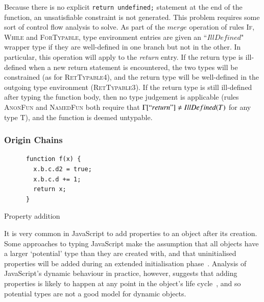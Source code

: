 \documentclass[12pt,a4paper,twoside,openright]{report}
\theoremstyle{definition}
\theoremstyle{dotless}
\newcommand*{\js}{\texttt}
\begin{document}
Because there is no explicit \js{return undefined;} statement at the end of the
function, an unsatisfiable constraint is not generated. This problem requires
some sort of control flow analysis to solve. As part of the $merge$ operation
of rules \textsc{If}, \textsc{While} and \textsc{ForTypable}, type environment
entries are given an ``$IllDefined$" wrapper type if they are well-defined in
one branch but not in the other. In particular, this operation will apply to
the \textit{return} entry. If the return type is ill-defined when a new return
statement is encountered, the two types will be constrained (as for
\textsc{RetTypable4}), and the return type will be well-defined in the outgoing
type environment (\textsc{RetTypable3}).  If the return type is still
ill-defined after typing the function body, then no type judgement is
applicable (rules \textsc{AnonFun} and \textsc{NamedFun} both require that
$\Gamma[``return"]\neq IllDefined(T)$ for any type T), and the function is
deemed untypable.

\subsubsection*{Origin Chains}
\begin{program}[t]
  \centering
  \begin{minipage}[b]{0.45\linewidth}
 	\begin{verbatim}
	  function f(x) {
	 	x.b.c.d2 = true;
	 	x.b.c.d += 1;
	 	return x;
	  }	
 	\end{verbatim}
 	\vspace{23mm}
  \end{minipage}
  \quad
  \begin{minipage}[b]{0.45\linewidth}
  \end{minipage}
  \caption{Property addition}\label{lst:propAdd}
\end{program}
It is very common in JavaScript to add properties to an object
after its creation. Some approaches to typing JavaScript make the assumption
that all objects have a larger `potential' type than they are created with, and
that uninitialised properties will be added during an extended initialisation
phase~\cite{anderson05}. Analysis of JavaScript's dynamic behaviour in
practice, however, suggests that adding properties is likely to happen at any
point in the object's life cycle~\cite{JSBehaviour}, and so potential types are
not a good model for dynamic objects.
\end{document}
